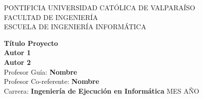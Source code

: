 
\newpage

\begin{center}
\large{PONTIFICIA UNIVERSIDAD CATÓLICA DE VALPARAÍSO\\FACULTAD DE INGENIERÍA\\ESCUELA DE INGENIERÍA INFORMÁTICA}

\vskip 0.9in

\Large{\textbf{Título Proyecto}}
\vskip 0.4in
\Large{\textbf{\\Autor 1\\}}
\vskip 0.2in
\Large{\textbf{Autor 2\\}}
\vskip 0.9in
\Large{Profesor Guía: \textbf{Nombre\\}}
\vskip 0.2in
\Large{Profesor Co-referente: \textbf{Nombre}\\}
\vskip 0.2in
\Large{Carrera: \textbf{Ingeniería de Ejecución en Informática}}
\vskip 2.5in
\large{MES AÑO}
\end{center}

\pagestyle{empty}

